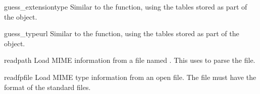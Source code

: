 \begin{methoddesc}{guess_extension}{type}
  Similar to the  function, using the
  tables stored as part of the object.
\end{methoddesc}

\begin{methoddesc}{guess_type}{url}
  Similar to the  function, using the tables
  stored as part of the object.
\end{methoddesc}

\begin{methoddesc}{read}{path}
  Load MIME information from a file named .  This uses
   to parse the file.
\end{methoddesc}

\begin{methoddesc}{readfp}{file}
  Load MIME type information from an open file.  The file must have
  the format of the standard  files.
\end{methoddesc}
